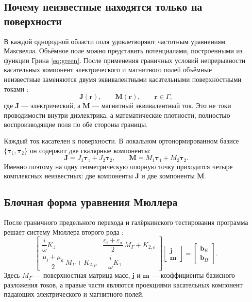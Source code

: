 \documentclass[12pt,a4paper]{article}
\newcommand{\vJ}{\mathbf{J}}
\newcommand{\vM}{\mathbf{M}}
\newcommand{\vr}{\mathbf{r}}
\begin{document}
\subsection{Почему неизвестные находятся только на поверхности}

В каждой однородной области поля удовлетворяют частотным уравнениям Максвелла.
Объёмное поле можно представить потенциалами, построенными из функции Грина
\eqref{eq:green}. После применения граничных условий непрерывности касательных
компонент электрического и магнитного полей объёмные неизвестные заменяются
двумя эквивалентными касательными поверхностными токами
\cite{muller1969,sauter2011}:
\begin{equation}
  \vJ(\vr),\qquad \vM(\vr),\qquad \vr\in\Gamma,
\end{equation}
где $\vJ$ --- электрический, а $\vM$ --- магнитный эквивалентный ток. Это не
токи проводимости внутри диэлектрика, а математические плотности, полностью
воспроизводящие поля по обе стороны границы.

Каждый ток касателен к поверхности. В локальном ортонормированном базисе
$\{\boldsymbol\tau_1,\boldsymbol\tau_2\}$ он содержит две скалярные компоненты:
\begin{equation}
  \vJ=J_1\boldsymbol\tau_1+J_2\boldsymbol\tau_2,
  \qquad
  \vM=M_1\boldsymbol\tau_1+M_2\boldsymbol\tau_2.
\end{equation}
Именно поэтому на одну геометрическую опорную точку приходится четыре
комплексных неизвестных: две компоненты $\vJ$ и две компоненты $\vM$.

\subsection{Блочная форма уравнения Мюллера}

После граничного предельного перехода и галёркинского тестирования программа
решает систему Мюллера второго рода \cite{muller1969,luo2026}:
\begin{equation}
  \begin{bmatrix}
    \dfrac{i}{\omega}K_1 &
    \dfrac{\varepsilon_i+\varepsilon_a}{2}\,M_\Gamma+K_{2,\varepsilon}\\[6pt]
    \dfrac{\mu_i+\mu_a}{2}\,M_\Gamma+K_{2,\mu} &
    -\dfrac{i}{\omega}K_1
  \end{bmatrix}
  \begin{bmatrix} \mathbf{j}\\ \mathbf{m} \end{bmatrix}
  =
  \begin{bmatrix} \mathbf{b}_E\\ \mathbf{b}_H \end{bmatrix}.
  \label{eq:muller-discrete}
\end{equation}
Здесь $M_\Gamma$ --- поверхностная матрица масс, $\mathbf{j}$ и $\mathbf{m}$
--- коэффициенты базисного разложения токов, а правые части являются проекциями
касательных компонент падающих электрического и магнитного полей.
\end{document}
